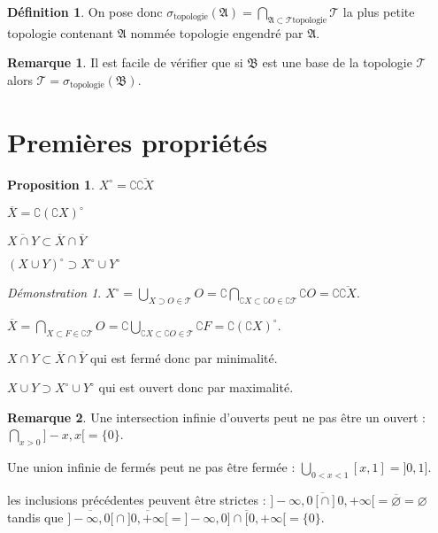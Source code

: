 \documentclass[a4paper, 11pt, french]{book}
\newenvironment{itemise}{\itemize}{\enditemize}
\theoremstyle{plain} %
\newtheorem{proposition}{Proposition}
\theoremstyle{definition} %
\newtheorem{definition}{Définition}
\newtheorem{remarque}{Remarque}
\theoremstyle{remark} %
\newtheorem*{demonstration}{Démonstration}
\newcommand{\1}{\mathds{1}}
\newcommand\vide{\varnothing}
\begin{document}
\begin{definition}
	On pose donc $\sigma_\text{topologie}(\mathfrak{A})=\bigcap_{\mathfrak{A}\subset\mathscr{T}\text{topologie}}\mathscr{T}$ la plus petite topologie contenant $\mathfrak{A}$ nommée topologie engendré par $\mathfrak{A}$.
\end{definition}

\begin{remarque}
	Il est facile de vérifier que si $\mathfrak{B}$ est une base de la topologie $\mathscr{T}$ alors $\mathscr{T}=\sigma_\text{topologie}(\mathfrak{B})$.
\end{remarque}


\section{Premières propriétés}

\begin{proposition}
	\begin{itemise}
		\item $X^\circ=\complement\overline{\complement X}$
		\item $\overline{X}=\complement(\complement X)^\circ$
		\item $\overline{X\cap Y}\subset\overline{X}\cap\overline{Y}$
		\item $(X\cup Y)^\circ\supset X^\circ\cup Y^\circ$
	\end{itemise}
\end{proposition}

\begin{demonstration}
	$X^\circ=\bigcup_{X\supset O\in\mathscr{T}}O=\complement\bigcap_{\complement X\subset\complement O\in\complement\mathscr{T}}\complement O=\complement\overline{\complement X}$.

	$\overline{X}=\bigcap_{X\subset F\in\complement\mathscr{T}}O=\complement\bigcup_{\complement X\subset\complement O\in\mathscr{T}}\complement F=\complement(\complement X)^\circ$.

	$X\cap Y\subset\overline{X}\cap\overline{Y}$ qui est fermé donc par minimalité.

	$X\cup Y\supset X^\circ\cup Y^\circ$ qui est ouvert donc par maximalité.
\end{demonstration}

\begin{remarque}
	\begin{itemise}
		\item Une intersection infinie d'ouverts peut ne pas être un ouvert : $\bigcap_{x>0}]-x,x[=\{0\}$.
		\item Une union infinie de fermés peut ne pas être fermée : $\bigcup_{0<x<1}[x,1]=]0, 1]$.
		\item les inclusions précédentes peuvent être strictes : $\overline{]-\infty, 0[\cap]0, +\infty[}=\overline{\vide}=\vide$ tandis que  $\overline{]-\infty, 0[}\cap\overline{]0, +\infty[}=]-\infty, 0]\cap\overline[0, +\infty[=\{0\}$.
	\end{itemise}
\end{remarque}
\end{document}
